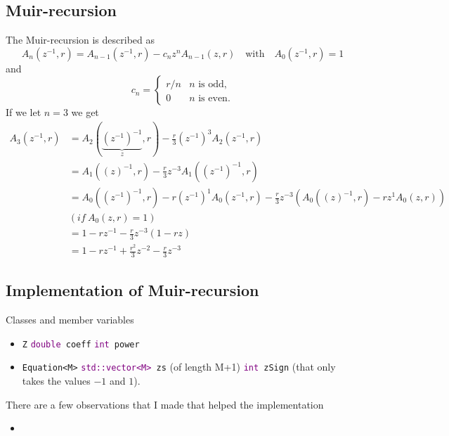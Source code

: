 \documentclass[dvipsnames]{article}
\def\type[#1]{\textcolor{purple}{#1}}
\def\z{z^{-1}}
\begin{document}
\subsection{Muir-recursion}
The Muir-recursion is described as
\begin{equation}\label{eq:muir}
    A_n(\z,r) = A_{n-1}(\z,r) -c_nz^nA_{n-1}(z,r) \quad \text{with} \quad A_0(z^{-1},r) = 1
\end{equation}
and
\begin{equation}
    c_n=
    \begin{cases}
    r/n & n \text{ is odd},\\
    0 & n \text{ is even.}
    \end{cases}
\end{equation}
If we let $n=3$ we get
\begin{equation}
    \begin{aligned}
        A_3(\z,r)&= A_2(\underbrace{(\z)^{-1}}_{z},r) - \frac{r}{3}(\z)^3A_2(\z,r)\\
        &= A_1((z)^{-1},r) - \frac{r}{3}z^{-3}A_1((\z)^{-1},r)\\
        &= A_0((\z)^{-1},r) - r(\z)^1A_0(\z,r)-\frac{r}{3}z^{-3}\left(A_0((z)^{-1},r)-rz^1A_0(z,r)\right)\\
        &(if\ A_0(z,r) = 1)\\
        &=1-r\z-\frac{r}{3}z^{-3}\left(1-rz\right)\\
        &=1-r\z+\frac{r^2}{3}z^{-2}-\frac{r}{3}z^{-3}
    \end{aligned}
\end{equation}
\subsection{Implementation of Muir-recursion}
Classes and member variables

\begin{itemize}
    \item \texttt{Z}
    \subitem \texttt{\type[double] coeff}
    \subitem \texttt{\type[int] power}
    \item \texttt{Equation\textless M\textgreater}
    \subitem \texttt{\type[std::vector\textless M\textgreater] zs} (of length M+1)
    \subitem \texttt{\type[int] zSign} (that only takes the values $-1$ and $1$).
\end{itemize}

There are a few observations that I made that helped the implementation
\begin{itemize}
    \item 
\end{itemize}
\end{document}
